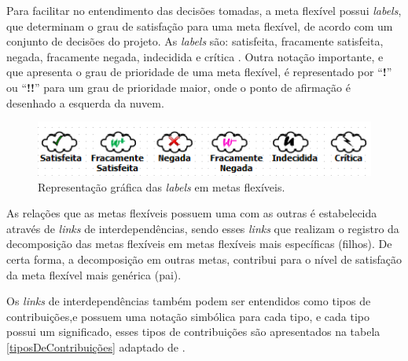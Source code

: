 Para facilitar no entendimento das decisões tomadas, a meta flexível possui \textit{labels}, que determinam o grau de satisfação para uma meta flexível, de acordo com um conjunto de decisões do projeto. As \textit{labels} são: satisfeita, fracamente satisfeita,  negada, fracamente negada, indecidida e crítica \cite{chung2012non}. Outra notação importante, e que apresenta o grau de prioridade de uma meta flexível, é representado por “\textbf{!}” ou “\textbf{!!}” para um grau de prioridade maior, onde o ponto de afirmação é desenhado a esquerda da nuvem.

\begin{figure}[h]
	\centering
	\includegraphics[keepaspectratio=true,scale=0.9]{figuras/labelsSoftgoals.png}
	\caption{Representação gráfica das \textit{labels} em metas flexíveis.}
	\label{fig02}
\end{figure} 

As relações que as metas flexíveis possuem uma com as outras é estabelecida através de \textit{links} de interdependências, sendo esses \textit{links} que realizam o registro da decomposição das metas flexíveis em metas flexíveis mais específicas (filhos). De certa forma, a decomposição em outras metas, contribui para o nível de satisfação da meta flexível mais genérica (pai).

Os \textit{links} de interdependências também podem ser entendidos como tipos de contribuições,e possuem uma notação simbólica para cada tipo, e cada tipo possui um significado, esses tipos de contribuições são apresentados na tabela \ref{tiposDeContribuições} adaptado de  \cite{chung2012non}.



